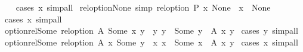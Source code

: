 \begin{isabellebody}
%
\isadelimproof
\ \ %
\endisadelimproof
%
\isatagproof
{}\isamarkupfalse%
\ {\isacharparenleft}{\kern0pt}cases\ x{\isacharparenright}{\kern0pt}\ simp{\isacharunderscore}{\kern0pt}all%
\endisatagproof
{\isafoldproof}%
%
\isadelimproof
\isanewline
%
\endisadelimproof
\isanewline
{}\isamarkupfalse%
\ rel{\isacharunderscore}{\kern0pt}option{\isacharunderscore}{\kern0pt}None{}\ {\isacharbrackleft}{\kern0pt}simp{\isacharbrackright}{\kern0pt}{\isacharcolon}{\kern0pt}\ {\isachardoublequoteopen}rel{\isacharunderscore}{\kern0pt}option\ P\ x\ None\ {\isasymlongleftrightarrow}\ x\ {\isacharequal}{\kern0pt}\ None{\isachardoublequoteclose}\isanewline
%
\isadelimproof
\ \ %
\endisadelimproof
%
\isatagproof
{}\isamarkupfalse%
\ {\isacharparenleft}{\kern0pt}cases\ x{\isacharparenright}{\kern0pt}\ simp{\isacharunderscore}{\kern0pt}all%
\endisatagproof
{\isafoldproof}%
%
\isadelimproof
\isanewline
%
\endisadelimproof
\isanewline
{}\isamarkupfalse%
\ option{\isacharunderscore}{\kern0pt}rel{\isacharunderscore}{\kern0pt}Some{}{\isacharcolon}{\kern0pt}\ {\isachardoublequoteopen}rel{\isacharunderscore}{\kern0pt}option\ A\ {\isacharparenleft}{\kern0pt}Some\ x{\isacharparenright}{\kern0pt}\ y\ {\isasymlongleftrightarrow}\ {\isacharparenleft}{\kern0pt}{\isasymexists}y{\isacharprime}{\kern0pt}{\isachardot}{\kern0pt}\ y\ {\isacharequal}{\kern0pt}\ Some\ y{\isacharprime}{\kern0pt}\ {\isasymand}\ A\ x\ y{\isacharprime}{\kern0pt}{\isacharparenright}{\kern0pt}{\isachardoublequoteclose}\ \isanewline
%
\isadelimproof
%
\endisadelimproof
%
\isatagproof
{}\isamarkupfalse%
{\isacharparenleft}{\kern0pt}cases\ y{\isacharparenright}{\kern0pt}\ simp{\isacharunderscore}{\kern0pt}all%
\endisatagproof
{\isafoldproof}%
%
\isadelimproof
%
\endisadelimproof
\isanewline
\isanewline
{}\isamarkupfalse%
\ option{\isacharunderscore}{\kern0pt}rel{\isacharunderscore}{\kern0pt}Some{}{\isacharcolon}{\kern0pt}\ {\isachardoublequoteopen}rel{\isacharunderscore}{\kern0pt}option\ A\ x\ {\isacharparenleft}{\kern0pt}Some\ y{\isacharparenright}{\kern0pt}\ {\isasymlongleftrightarrow}\ {\isacharparenleft}{\kern0pt}{\isasymexists}x{\isacharprime}{\kern0pt}{\isachardot}{\kern0pt}\ x\ {\isacharequal}{\kern0pt}\ Some\ x{\isacharprime}{\kern0pt}\ {\isasymand}\ A\ x{\isacharprime}{\kern0pt}\ y{\isacharparenright}{\kern0pt}{\isachardoublequoteclose}\ \isanewline
%
\isadelimproof
%
\endisadelimproof
%
\isatagproof
{}\isamarkupfalse%
{\isacharparenleft}{\kern0pt}cases\ x{\isacharparenright}{\kern0pt}\ simp{\isacharunderscore}{\kern0pt}all%

\end{isabellebody}
